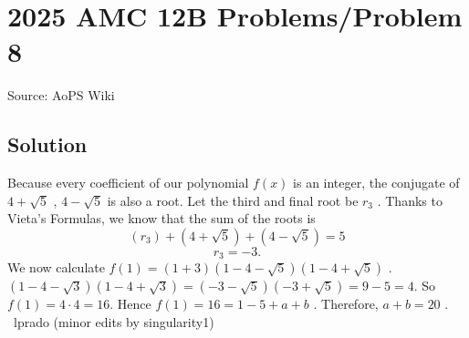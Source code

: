 \documentclass[12pt]{article}
\begin{document}
\section*{{2025 AMC 12B Problems/Problem 8}}
Source: AoPS Wiki

\subsection*{Solution}
Because every coefficient of our polynomial $f(x)$ is an integer, the conjugate of $4+\sqrt{5}$ , $4-\sqrt{5}$ is also a root. Let the third and final root be $r_3$ . Thanks to Vieta's Formulas, we know that the sum of the roots is \[(r_3) + (4+\sqrt{5}) + (4 - \sqrt{5}) = 5\] \[r_3 = -3.\] We now calculate $f(1) = (1+3)(1-4-\sqrt{5})(1-4+\sqrt{5})$ . $(1-4-\sqrt{3})(1-4+\sqrt{3}) = (-3-\sqrt{5})(-3+\sqrt{5}) = 9 - 5 = 4.$ So $f(1) = 4 \cdot 4 = 16.$ Hence $f(1) = 16 = 1-5 + a + b$ . Therefore, $a + b = \boxed{20}$ . ~lprado (minor edits by singularity1)
\end{document}
